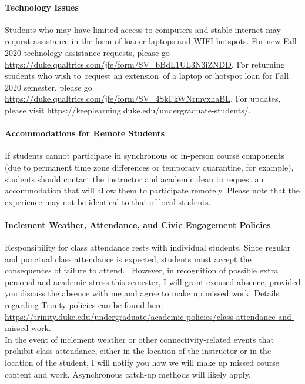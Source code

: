 \documentclass[11pt]{article}
\begin{document}
\paragraph{Technology Issues}

Students who may have limited access to computers and stable internet may request assistance in the form of loaner laptops and WIFI hotspots.  For new Fall 2020 technology assistance requests, please go \url{https://duke.qualtrics.com/jfe/form/SV_bBdL1UL3N3iZNDD}.  For returning students who wish to request an extension of a laptop or hotspot loan for Fall 2020 semester, please go \url{https://duke.qualtrics.com/jfe/form/SV_4SkFkWNrmvxhaBL}. For updates, please visit https://keeplearning.duke.edu/undergraduate-students/.\\

\paragraph{Accommodations for Remote Students}
If students cannot participate in synchronous or in-person course components (due to permanent time zone differences or temporary quarantine, for example), students should contact the instructor and academic dean to request an accommodation that will allow them to participate remotely. Please note that the experience may not be identical to that of local students.\\

\paragraph{Inclement Weather, Attendance, and Civic Engagement Policies}
Responsibility for class attendance rests with individual students. Since regular and punctual class attendance is expected, students must accept the consequences of failure to attend.  However, in recognition of possible extra personal and academic stress this semester, I will grant excused absence, provided you discuss the absence with me and agree to make up missed work. Details regarding Trinity policies can be found here \url{https://trinity.duke.edu/undergraduate/academic-policies/class-attendance-and-missed-work}. \\

In the event of inclement weather or other connectivity-related events that prohibit class attendance, either in the location of the instructor or in the location of the student, I will notify you how we will make up missed course content and work.  Asynchronous catch-up methods will likely apply.\\
\end{document}
